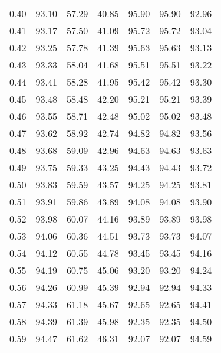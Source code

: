 \begin{tabular}{|c|c|c|c|c|c|c|}
      0.40 &     93.10 &     57.29 &      40.85 &   95.90 &      95.90 &         92.96 \\
      0.41 &     93.17 &     57.50 &      41.09 &   95.72 &      95.72 &         93.04 \\
      0.42 &     93.25 &     57.78 &      41.39 &   95.63 &      95.63 &         93.13 \\
      0.43 &     93.33 &     58.04 &      41.68 &   95.51 &      95.51 &         93.22 \\
      0.44 &     93.41 &     58.28 &      41.95 &   95.42 &      95.42 &         93.30 \\
      0.45 &     93.48 &     58.48 &      42.20 &   95.21 &      95.21 &         93.39 \\
      0.46 &     93.55 &     58.71 &      42.48 &   95.02 &      95.02 &         93.48 \\
      0.47 &     93.62 &     58.92 &      42.74 &   94.82 &      94.82 &         93.56 \\
      0.48 &     93.68 &     59.09 &      42.96 &   94.63 &      94.63 &         93.63 \\
      0.49 &     93.75 &     59.33 &      43.25 &   94.43 &      94.43 &         93.72 \\
      0.50 &     93.83 &     59.59 &      43.57 &   94.25 &      94.25 &         93.81 \\
      0.51 &     93.91 &     59.86 &      43.89 &   94.08 &      94.08 &         93.90 \\
      0.52 &     93.98 &     60.07 &      44.16 &   93.89 &      93.89 &         93.98 \\
      0.53 &     94.06 &     60.36 &      44.51 &   93.73 &      93.73 &         94.07 \\
      0.54 &     94.12 &     60.55 &      44.78 &   93.45 &      93.45 &         94.16 \\
      0.55 &     94.19 &     60.75 &      45.06 &   93.20 &      93.20 &         94.24 \\
      0.56 &     94.26 &     60.99 &      45.39 &   92.94 &      92.94 &         94.33 \\
      0.57 &     94.33 &     61.18 &      45.67 &   92.65 &      92.65 &         94.41 \\
      0.58 &     94.39 &     61.39 &      45.98 &   92.35 &      92.35 &         94.50 \\
      0.59 &     94.47 &     61.62 &      46.31 &   92.07 &      92.07 &         94.59 \\

\end{tabular}
